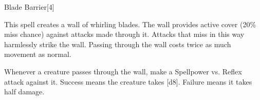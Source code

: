 \begin{spellsection}{Blade Barrier}[4]
    \begin{spellheader}
    \end{spellheader}
    \begin{spellcontent}
        \begin{spelltargetinginfo}
        \end{spelltargetinginfo}
        \begin{spelleffects}
            \spelleffect This spell creates a wall of whirling blades. The wall provides active cover (20\% miss chance) against attacks made through it. Attacks that miss in this way harmlessly strike the wall. Passing through the wall costs twice as much movement as normal.

            Whenever a creature passes through the wall, make a Spellpower vs. Reflex attack against it. Success means the creature takes [d8]. Failure means it takes half damage.
            \spelldur \durshort \dismissable
        \end{spelleffects}
    \end{spellcontent}
    \begin{spellfooter}
        \miscastexplode
    \end{spellfooter}
    \begin{spellaugments}
    \end{spellaugments}
\end{spellsection}

